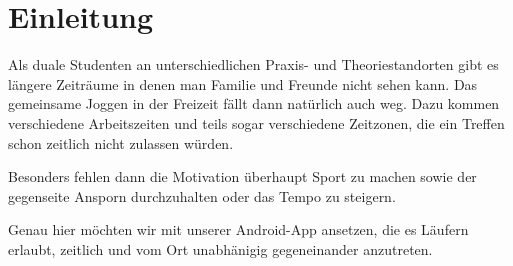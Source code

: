 \section{Einleitung}\label{einleitung}
Als duale Studenten an unterschiedlichen Praxis- und Theoriestandorten gibt es längere Zeiträume in denen man Familie und Freunde nicht sehen kann. Das gemeinsame Joggen in der Freizeit fällt dann natürlich auch weg. Dazu kommen verschiedene Arbeitszeiten und teils sogar verschiedene Zeitzonen, die ein Treffen schon zeitlich nicht zulassen würden. 

Besonders fehlen dann die Motivation überhaupt Sport zu machen sowie der gegenseite Ansporn durchzuhalten oder das Tempo zu steigern. 

Genau hier möchten wir mit unserer Android-App ansetzen, die es Läufern erlaubt, zeitlich und vom Ort unabhänigig gegeneinander anzutreten.
